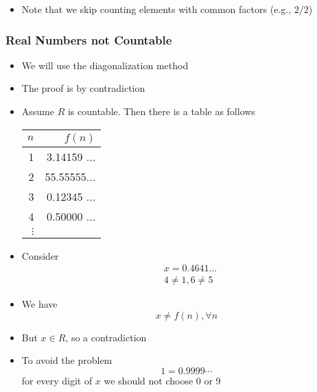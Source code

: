 \begin{frame}[allowframebreaks]
\begin{itemize}
\item Note that we skip counting elements with common factors (e.g., $2/2$)
\end{itemize}\end{frame} \begin{frame}[allowframebreaks] \frametitle{Real Numbers not Countable}
  \begin{itemize}
\item We will use the diagonalization method 
\item The proof is by contradiction
\item Assume $R$ is countable. Then there is a table as follows
  \begin{center}
  \begin{tabular}{r|r}
$n$ & $f(n)$ \\ \hline
1 & 3.14159 $\ldots$\\
2 & 55.55555$\ldots$\\
3 & 0.12345 $\ldots$ \\
4 & 0.50000 $\ldots$ \\
$\vdots$ & 
  \end{tabular}
\end{center}

\item Consider
  \begin{equation*}
    \begin{split}
&    x=0.4641\ldots\\
&    4\neq 1, 6 \neq 5
  \end{split}
\end{equation*}
\item We have
  \begin{equation*}
x \neq f(n), \forall n
\end{equation*}
\item But $x \in R$, so a contradiction
\item To avoid the problem
  \begin{equation*}
  1=0.9999\cdots
\end{equation*}
for every digit of $x$ we should not choose 0 or 9
\end{itemize}\end{frame}




